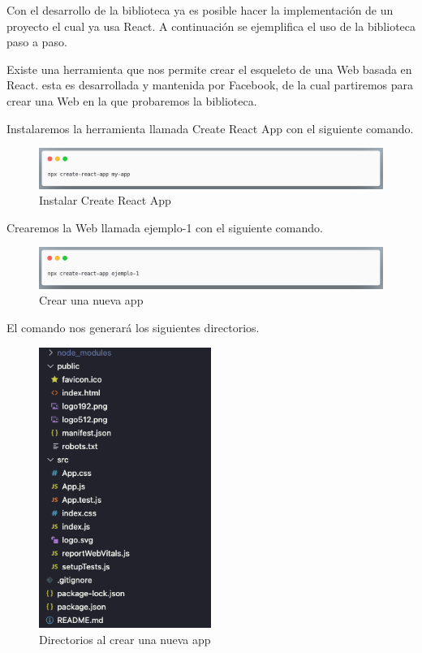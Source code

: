 Con el desarrollo de la biblioteca ya es posible hacer la implementación de un proyecto el cual ya usa React.
A continuación se ejemplifica el uso de la biblioteca paso a paso.

Existe una herramienta que nos permite crear el esqueleto de una Web basada en React. \cite{CRA} esta es desarrollada y mantenida por Facebook, de la cual partiremos para crear una Web en la que probaremos la biblioteca.

Instalaremos la herramienta llamada Create React App con el siguiente comando.
\newline
\begin{figure}[H]
    \includegraphics[width=1\textwidth]{./Imagenes/9.1.png}
    \caption[Instalar Create React App]{Instalar Create React App}
    \end{figure}
\newline

Crearemos la Web llamada ejemplo-1 con el siguiente comando.
\newline
\begin{figure}[H]
    \includegraphics[width=1\textwidth]{./Imagenes/9.2.png}
    \caption[Crear una nueva app]{Crear una nueva app}
    \end{figure}
\newline

El comando nos generará los siguientes directorios.
\newline
\begin{figure}[H]
    \includegraphics[width=0.5\textwidth]{./Imagenes/9.3.png}
   \centering 
    \caption[Directorios al crear una nueva app]{Directorios al crear una nueva app}
    \end{figure}
\newline

